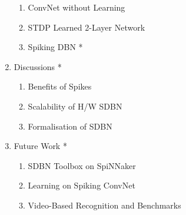 \documentclass[journal]{journal}
\begin{document}
\begin{appendices}
\begin{enumerate}
			\begin{enumerate}
				\item ConvNet without Learning
				\item STDP Learned 2-Layer Network
				\item Spiking DBN *
			\end{enumerate}	
		\item Discussions *
			\begin{enumerate}
				\item Benefits of Spikes
				\item Scalability of H/W SDBN
				\item Formalisation of SDBN
			\end{enumerate}					
		\item Future Work *
			\begin{enumerate}
				\item SDBN Toolbox on SpiNNaker
				\item Learning on Spiking ConvNet
				\item Video-Based Recognition and Benchmarks
			\end{enumerate}					
	\end{enumerate}	
\end{appendices}



\end{document}
